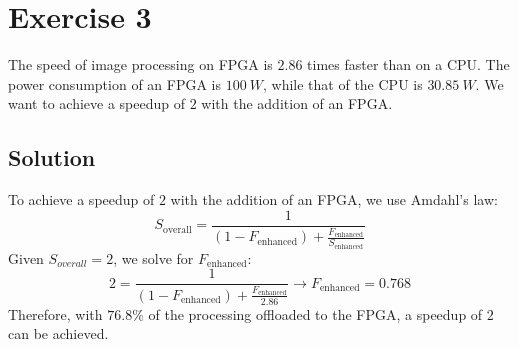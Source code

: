 \section{Exercise 3}

The speed of image processing on FPGA is $2.86$ times faster than on a CPU.\@
The power consumption of an FPGA is $100\:W$, while that of the CPU is $30.85\:W$.
We want to achieve a speedup of $2$ with the addition of an FPGA.\@

\subsection*{Solution}
To achieve a speedup of $2$ with the addition of an FPGA, we use Amdahl's law:
\[S_{\text{overall}}=\dfrac{1}{\left(1-F_{\text{enhanced}}\right)+\frac{F_{\text{enhanced}}}{S_{\text{enhanced}}}}\]
Given $S_{overall} = 2$, we solve for $F_{\text{enhanced}}$:
\[2=\dfrac{1}{\left(1-F_{\text{enhanced}}\right)+\frac{F_{\text{enhanced}}}{2.86}}\rightarrow F_{\text{enhanced}}=0.768\]
Therefore, with $76.8\%$ of the processing offloaded to the FPGA, a speedup of $2$ can be achieved.